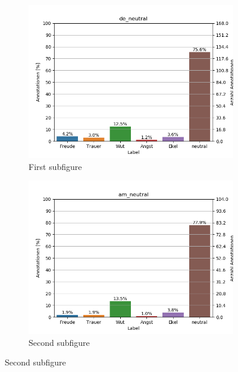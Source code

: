 \documentclass[11pt,a4paper,headsepline,twoside,toc=bibliography]{scrreprt}
\begin{document}
\begin{figure}[t!] %
	\begin{subfigure}{0.48\textwidth}
		\includegraphics[width=\linewidth]{plots/de_neutral.png}
		\caption{First subfigure} \label{fig:de_s}
	\end{subfigure}\hspace*{\fill}
	\begin{subfigure}{0.48\textwidth}
		\includegraphics[width=\linewidth]{plots/am_neutral.png}
		\caption{Second subfigure} \label{fig:am_s}
	\end{subfigure}
	

\end{figure}
\end{document}
